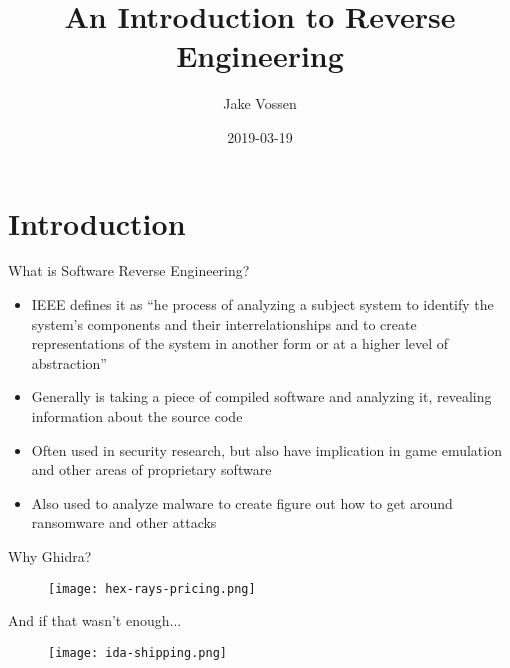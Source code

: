 \documentclass{beamer}
\title[Ghidra]{An Introduction to Reverse Engineering}
\author{Jake Vossen}
\institute{Colorado School of Mines - oresec}
\date{2019-03-19}
\begin{document}
\begin{frame}
  \titlepage
\end{frame}


\section{Introduction}

\begin{frame}{What is Software Reverse Engineering?}

\begin{itemize}
  \item IEEE defines it as ``he process of analyzing a subject system to identify the system's components and their interrelationships and to create representations of the system in another form or at a higher level of abstraction''
  \item Generally is taking a piece of compiled software and analyzing
    it, revealing information about the source code
  \item Often used in security research, but also have implication in
    game emulation and other areas of proprietary software
  \item Also used to analyze malware to create figure out how to get
    around ransomware and other attacks
\end{itemize}

\vskip 1cm

\end{frame}

\begin{frame}{Why Ghidra?}
  \begin{figure}
    \texttt{[image: hex-rays-pricing.png]}
  \end{figure}
\end{frame}

\begin{frame}{And if that wasn't enough...}
  \begin{figure}
    \texttt{[image: ida-shipping.png]}
  \end{figure}
\end{frame}
\end{document}
